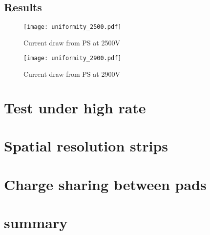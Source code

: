 \subsection{Results}

\begin{figure}[h]
	\centering
	\texttt{[image: uniformity\_2500.pdf]}
	\caption{Current draw from PS at 2500V}\label{fig:2500V}
\end{figure}

\begin{figure}[h]
	\centering
	\texttt{[image: uniformity\_2900.pdf]}
	\caption{Current draw from PS at 2900V}\label{fig:2900V}
\end{figure}


\section{Test under high rate}


\section{Spatial resolution strips}

\section{Charge sharing between pads}

\section{summary}
